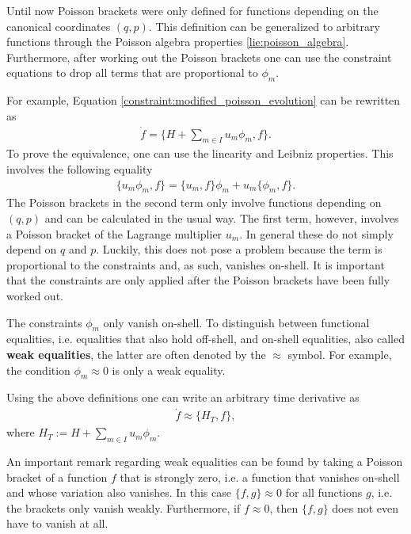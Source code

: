     \begin{method}
        Until now Poisson brackets were only defined for functions depending on the canonical coordinates $(q,p)$. This definition can be generalized to arbitrary functions through the Poisson algebra properties \ref{lie:poisson_algebra}. Furthermore, after working out the Poisson brackets one can use the constraint equations to drop all terms that are proportional to $\phi_m$.

        For example, Equation \eqref{constraint:modified_poisson_evolution} can be rewritten as
        \begin{gather}
            \dot{f} = \{H + \sum_{m\in I}u_m\phi_m,f\}.
        \end{gather}
        To prove the equivalence, one can use the linearity and Leibniz properties. This involves the following equality
        \begin{gather}
            \{u_m\phi_m, f\} = \{u_m,f\}\phi_m + u_m\{\phi_m,f\}.
        \end{gather}
        The Poisson brackets in the second term only involve functions depending on $(q,p)$ and can be calculated in the usual way. The first term, however, involves a Poisson bracket of the Lagrange multiplier $u_m$. In general these do not simply depend on $q$ and $p$. Luckily, this does not pose a problem because the term is proportional to the constraints and, as such, vanishes on-shell. It is important that the constraints are only applied after the Poisson brackets have been fully worked out.
    \end{method}

    \begin{notation}
        The constraints $\phi_m$ only vanish on-shell. To distinguish between functional equalities, i.e. equalities that also hold off-shell, and on-shell equalities, also called \textbf{weak equalities}, the latter are often denoted by the $\approx$ symbol. For example, the condition $\phi_m\approx0$ is only a weak equality.
    \end{notation}
    Using the above definitions one can write an arbitrary time derivative as
    \begin{gather}
        \dot{f}\approx\{H_T,f\},
    \end{gather}
    where $H_T := H + \sum_{m\in I}u_m\phi_m$.

    \begin{remark}[Closure]
        An important remark regarding weak equalities can be found by taking a Poisson bracket of a function $f$ that is strongly zero, i.e. a function that vanishes on-shell and whose variation also vanishes. In this case $\{f,g\}\approx0$ for all functions $g$, i.e. the brackets only vanish weakly. Furthermore, if $f\approx0$, then $\{f,g\}$ does not even have to vanish at all.
    \end{remark}

